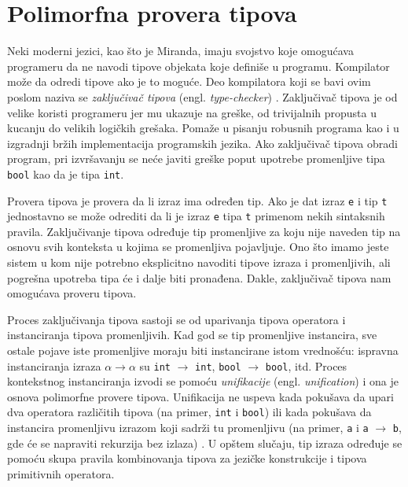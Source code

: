 \documentclass[a4paper]{article}
\begin{document}
\section{Polimorfna provera tipova}
\label{sec:provera tipova}

Neki moderni jezici, kao što je Miranda, imaju svojstvo koje omogućava programeru da ne navodi tipove objekata koje definiše u programu. Kompilator može da odredi tipove ako je to moguće. Deo kompilatora koji se bavi ovim poslom naziva se \textit{zaključivač tipova} (engl. \textit{type-checker}) \cite{the-implementation-of-functional-programming-languages}. Zaključivač tipova je od velike koristi programeru jer mu ukazuje na greške, od trivijalnih propusta u kucanju do velikih logičkih grešaka. Pomaže u pisanju robusnih programa kao i u izgradnji bržih implementacija programskih jezika. Ako zaključivač tipova obradi program, pri izvršavanju se neće javiti greške poput upotrebe promenljive tipa \verb|bool| kao da je tipa \verb|int|.


Provera tipova je provera da li izraz ima određen tip. Ako je dat izraz \verb|e| i tip \verb|t| jednostavno se može odrediti da li je izraz \verb|e| tipa \verb|t| primenom nekih sintaksnih pravila. Zaključivanje tipova određuje tip promenljive za koju nije naveden tip na osnovu svih konteksta u kojima se promenljiva pojavljuje. Ono što imamo jeste sistem u kom nije potrebno eksplicitno navoditi tipove izraza i promenljivih, ali pogrešna upotreba tipa će i dalje biti pronađena. Dakle, zaključivač tipova nam omogućava proveru tipova. 


Proces zaključivanja tipova sastoji se od uparivanja tipova operatora i instanciranja tipova promenljivih. Kad god se tip promenljive instancira, sve ostale pojave iste promenljive moraju biti instancirane istom vrednošću: ispravna instanciranja izraza $\alpha \longrightarrow \alpha$ su \verb|int| $\longrightarrow$ \verb|int|,  \verb|bool| $\longrightarrow$ \verb|bool|, itd. Proces kontekstnog instanciranja izvodi se pomoću \textit{unifikacije} (engl. \textit{unification}) i ona je osnova polimorfne provere tipova. Unifikacija ne uspeva kada pokušava da upari dva operatora različitih tipova (na primer, \verb|int| i \verb|bool|) ili kada pokušava da instancira promenljivu izrazom koji sadrži tu promenljivu (na primer, \verb|a| i \verb|a| $\longrightarrow$ \verb|b|, gde će se napraviti rekurzija bez izlaza) \cite{basic-typechecking}. U opštem slučaju, tip izraza određuje se pomoću skupa pravila kombinovanja tipova za jezičke konstrukcije i tipova primitivnih operatora. 
\end{document}
